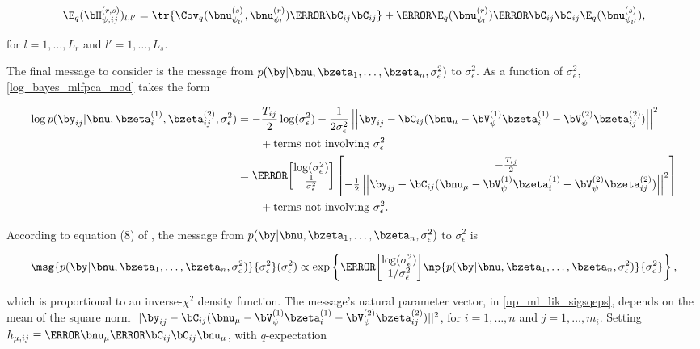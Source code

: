 \documentclass[12pt]{article}
\theoremstyle{plain}
\theoremstyle{definition}
\theoremstyle{remark}
\def\sigsqeps{\sigma^2_{\epsilon}}
\def\numu{\bnu_\mu}
\newcommand\hmu[1]{h_{\mu, #1}}
\newcommand\HpsiL[2]{\bH^{(#1)}_{\psi, #2}}
\newcommand\VpsiL[1]{\bV^{(#1)}_{\psi}}
\newcommand\bzetaL[2]{\bzeta^{(#1)}_{#2}}
\newcommand\nupsiL[2]{\bnu^{(#1)}_{\psi_{#2}}}
\newcommand\tni[1]{\text{terms not involving $#1$}}
\begin{document}
\begin{equation}
	\E_q (\HpsiL{r, s}{ij})_{l, l'} =
		\tr \{ \Cov_q (\nupsiL{s}{l'}, \nupsiL{r}{l}) \T{\bC_{ij}} \bC_{ij} \}
		+ \T{\E_q (\nupsiL{r}{l})} \T{\bC_{ij}} \bC_{ij} \E_q (\nupsiL{s}{l'}),
\label{exp_ml_lik_Hpsi}
\end{equation}

\noindent for $l = 1, \dots, L_r$ and $l' = 1, \dots, L_s$.

The final message to consider is the message from $p (\by | \bnu, \bzeta_1, \dots, \bzeta_n, \sigsqeps)$ to
$\sigsqeps$. As a function of $\sigsqeps$, \eqref{log_bayes_mlfpca_mod} takes the form

\begin{align*}
	\log p (\by_{ij} | \bnu, \bzetaL{1}{i}, \bzetaL{2}{ij}, \sigsqeps)
		& = -\frac{T_{ij}}{2} \log (\sigsqeps) - \frac{1}{2 \sigsqeps} \left|\left|
			\by_{ij} - \bC_{ij} ( \numu - \VpsiL{1} \bzetaL{1}{i} - \VpsiL{2} \bzetaL{2}{ij} )
		\right|\right|^2 \\ &\qquad + \tni{\sigsqeps} \\
		& = \T{
			\begin{bmatrix}
				\log (\sigsqeps) \\
				\frac{1}{\sigsqeps}
			\end{bmatrix}
		} \begin{bmatrix}
			-\frac{T_{ij}}{2} \\
			-\frac12 \left|\left| \by_{ij} - \bC_{ij} ( \numu - \VpsiL{1} \bzetaL{1}{i} - \VpsiL{2} \bzetaL{2}{ij} ) \right|\right|^2
		\end{bmatrix} \\ &\qquad + \tni{\sigsqeps}.
\end{align*}

\noindent According to equation (8) of \citet{wand17}, the message from $p (\by | \bnu,
\bzeta_1, \dots, \bzeta_n, \sigsqeps)$ to $\sigsqeps$ is

\[
	\msg{p (\by | \bnu, \bzeta_1, \dots, \bzeta_n, \sigsqeps)}{\sigsqeps} (\sigsqeps) \propto
		\exp \left\{
			\T{\begin{bmatrix}
				\log (\sigsqeps) \\
				1/\sigsqeps
			\end{bmatrix}}
			\np{p (\by | \bnu, \bzeta_1, \dots, \bzeta_n, \sigsqeps)}{\sigsqeps}
		\right\},
\]

\noindent which is proportional
to an inverse-$\chi^2$ density function. The message's natural parameter vector, in \eqref{np_ml_lik_sigsqeps}, depends
on the mean of the square norm $|| \by_{ij} - \bC_{ij} ( \numu - \VpsiL{1} \bzetaL{1}{i} - \VpsiL{2} \bzetaL{2}{ij} ) ||^2$,
for $i = 1, \dots, n$ and $j = 1, \dots, m_i$. Setting $\hmu{ij} \equiv \T{\numu} \T{\bC_{ij}} \bC_{ij} \numu$, with
$q$-expectation
\end{document}
